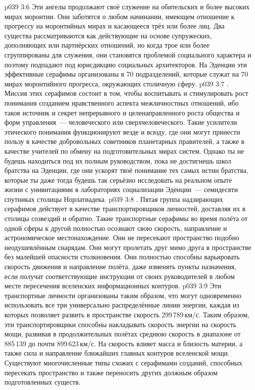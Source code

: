 \vs p039 3:6 Эти ангелы продолжают своё служение на обительских и более высоких мирах моронтии. Они заботятся о любом начинании, имеющем отношение к прогрессу на моронтийных мирах и касающееся трёх или более лиц. Два существа рассматриваются как действующие на основе супружеских, дополняющих или партнёрских отношений, но когда трое или более сгруппированы для служения, они становятся проблемой социального характера и поэтому подпадают под юрисдикцию социальных архитекторов. На Эденции эти эффективные серафимы организованы в 70 подразделений, которые служат на 70 мирах моронтийного прогресса, окружающих столичную сферу.
\vs p039 3:7 . Миссия этих серафимов состоит в том, чтобы воспитывать и стимулировать рост понимания созданием нравственного аспекта межличностных отношений, ибо таков источник и секрет непрерывного и целенаправленного роста общества и форм управления~--- человеческого или сверхчеловеческого. Такие усилители этического понимания функционируют везде и всюду, где они могут принести пользу в качестве добровольных советников планетарных правителей, а также в качестве учителей по обмену на подготовительных мирах систем. Однако ты не будешь находиться под их полным руководством, пока не достигнешь школ братства на Эденции, где они ускорят твоё понимание тех самых истин братства, которые ты даже тогда будешь так серьёзно исследовать на реальном опыте жизни с унивитациями в лабораториях социализации Эденции~--- семидесяти спутниках столицы Норлатиадека.
\vs p039 3:8 . Пятая группа надзирающих серафимов действует в качестве транспортировщиков личностей, доставляя их в столицы созвездий и обратно. Такие транспортные серафимы во время полёта от одной сферы к другой полностью осознают свою скорость, направление и астрономическое местонахождение. Они не пересекают пространство подобно неодушевлённым снарядам. Они могут пролетать друг мимо друга в пространстве без малейшей опасности столкновения. Они полностью способны варьировать скорость движения и направление полёта, даже изменять пункты назначения, если получат соответствующие инструкции от своих руководителей в любом месте пересечения вселенских информационных контуров.
\vs p039 3:9 Эти транспортные личности организованы таким образом, что могут одновременно использовать все три универсально распределённые линии энергии, каждая из которых позволяет развить в пространстве скорость 299\,789\,км/с. Таким образом, эти транспортировщики способны накладывать скорость энергии на скорость мощи, развивая в продолжительных полётах среднюю скорость в диапазоне от 885\,139 до почти 899\,623\,км/с. На скорость влияет масса и близость материи, а также сила и направление ближайших главных контуров вселенской мощи. Существуют многочисленные типы схожих с серафимами созданий, способных пересекать пространство и также переносить других должным образом подготовленных существ.
